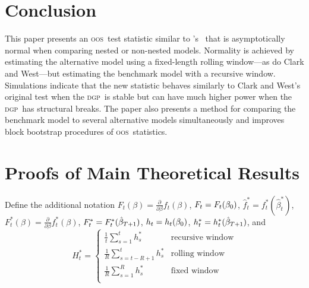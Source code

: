 \documentclass[11pt,fleqn]{article}
\newcommand\poscw{\citeauthor{ClW:06}'s \citeyearpar{ClW:06,ClW:07}}
\theoremstyle{definition}
\newcommand{\btrue}[1][]{\if#1*\hat\beta_{T+1}\else\beta_0\fi}
\newcommand{\dgp}{\textsc{dgp}}
\newcommand{\oos}{\textsc{oos}}
\begin{document}
\begin{table}[tb!]
  \centering
  \empiricaltable
\caption{Results from \oos\ comparison of equity premium prediction
  models; the benchmark is the recursive sample mean of the equity
  premium and each alternative model is a constant and single lag of
  the variable listed in the ``predictor'' column.  The dataset begins
  in 1927 and ends in 2009 and is annual data. The ``value'' column
  lists the value of this paper's \oos\ statistic, the ``naive''
  column indicates whether the statistic is significant at standard
  critical values, and the ``corrected'' column indicates significance
  using the critical values proposed in Theorem~\ref{res:2} that
  account for the number of models.  See Section~\ref{sec:3} for details.}
\label{tab:em1}
\end{table}


\section{Conclusion}\label{sec:4}
This paper presents an \oos\ test statistic similar to \poscw\ that is
asymptotically normal when comparing nested or non-nested models.
Normality is achieved by estimating the alternative model using a
fixed-length rolling window---as do Clark and West---but estimating
the benchmark model with a recursive window.  Simulations indicate
that the new statistic behaves similarly to Clark and West's original
test when the \dgp\ is stable but can have much higher power when the 
\dgp\ has structural breaks.  The paper also presents a
method for comparing the benchmark model to several alternative models
simultaneously and improves block bootstrap procedures of \oos\
statistics.

\appendix
\section{Proofs of Main Theoretical Results}\label{sec:B}

Define the additional notation 
$F_t(\beta) = \tfrac{\partial}{\partial \beta} f_t(\beta)$,
$F_t = F_t(\btrue)$,
$\hat f_t^* = f_t^*(\hat\beta_t^*)$,
$F_t^*(\beta) = \tfrac{\partial}{\partial \beta} f_t^*(\beta)$,
$F_t^* = F_t^*(\btrue[*])$,
$h_t = h_t(\btrue)$,
$h_t^* = h_t^*(\btrue[*])$, 
and
\begin{equation*}
      H_{t}^* = \begin{cases} 
        \tfrac1t \sum_{s=1}^t h_{s}^* & \text{recursive window} \\
        \tfrac1R \sum_{s=t-R+1}^t h_{s}^* & \text{rolling window} \\
        \tfrac1R \sum_{s=1}^R h_{s}^* & \text{fixed window} \\
      \end{cases}
\end{equation*}
    
\end{document}
